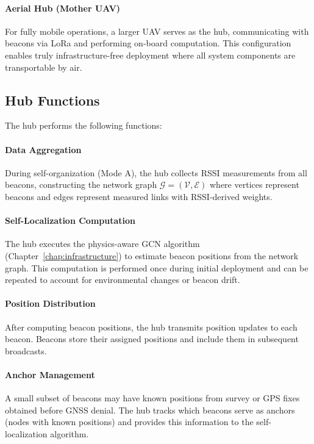 \documentclass[master,final,11pt]{iscs-thesis}
\begin{document}
\paragraph{Aerial Hub (Mother UAV)}
For fully mobile operations, a larger UAV serves as the hub, communicating with beacons via LoRa and performing on-board computation.
This configuration enables truly infrastructure-free deployment where all system components are transportable by air.

\subsection{Hub Functions}

The hub performs the following functions:

\paragraph{Data Aggregation}
During self-organization (Mode A), the hub collects RSSI measurements from all beacons, constructing the network graph $\mathcal{G} = (\mathcal{V}, \mathcal{E})$ where vertices represent beacons and edges represent measured links with RSSI-derived weights.

\paragraph{Self-Localization Computation}
The hub executes the physics-aware GCN algorithm (Chapter~\ref{chap:infrastructure}) to estimate beacon positions from the network graph.
This computation is performed once during initial deployment and can be repeated to account for environmental changes or beacon drift.

\paragraph{Position Distribution}
After computing beacon positions, the hub transmits position updates to each beacon.
Beacons store their assigned positions and include them in subsequent broadcasts.

\paragraph{Anchor Management}
A small subset of beacons may have known positions from survey or GPS fixes obtained before GNSS denial.
The hub tracks which beacons serve as anchors (nodes with known positions) and provides this information to the self-localization algorithm.
\end{document}
